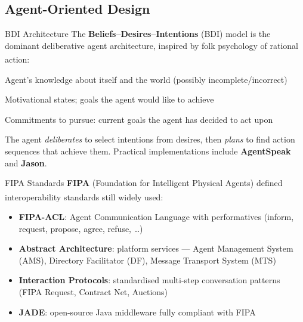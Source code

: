 \subsection{Agent-Oriented Design}

\begin{v3topic}{BDI Architecture}
    The \textbf{Beliefs--Desires--Intentions} (BDI) model is the dominant
    deliberative agent architecture, inspired by folk psychology of rational
    action:\textsuperscript{\cite[][p.~73]{wooldridgeIntroductionMultiAgentSystems2009}}
    \begin{description}[leftmargin=0.6cm, labelindent=0pt]
        \item[\textbf{Beliefs}] Agent's knowledge about itself and the world (possibly incomplete/incorrect)
        \item[\textbf{Desires}] Motivational states; goals the agent would like to achieve
        \item[\textbf{Intentions}] Commitments to pursue: current goals the agent has decided to act upon
    \end{description}
    The agent \emph{deliberates} to select intentions from desires, then
    \emph{plans} to find action sequences that achieve them.
    Practical implementations include \textbf{AgentSpeak} and \textbf{Jason}.

\end{v3topic}
\begin{v3topic}{FIPA Standards}
    \textbf{FIPA} (Foundation for Intelligent Physical Agents) defined
    interoperability standards still widely used:\textsuperscript{\cite[][Ch.~2]{bellifeministeDevelopingMultiAgentSystems2007}}
    \begin{itemize}
        \item \textbf{FIPA-ACL}: Agent Communication Language with performatives
              (inform, request, propose, agree, refuse, \ldots)
        \item \textbf{Abstract Architecture}: platform services — Agent Management
              System (AMS), Directory Facilitator (DF), Message Transport System (MTS)
        \item \textbf{Interaction Protocols}: standardised multi-step conversation patterns
              (FIPA Request, Contract Net, Auctions)
        \item \textbf{JADE}: open-source Java middleware fully compliant with FIPA
    \end{itemize}

\end{v3topic}
